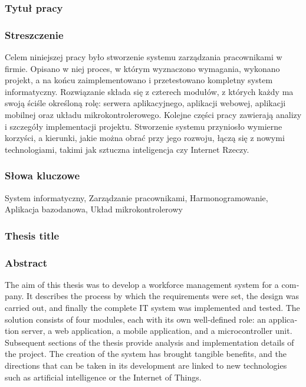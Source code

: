 \subsubsection*{Tytuł pracy}
\Title

\subsubsection*{Streszczenie}

Celem niniejszej pracy było stworzenie systemu zarządzania pracownikami w firmie. Opisano w niej proces, w którym wyznaczono wymagania, wykonano projekt, a na końcu zaimplementowano i przetestowano kompletny system informatyczny. Rozwiązanie składa się z czterech modułów, z których każdy ma swoją ściśle określoną rolę: serwera aplikacyjnego, aplikacji webowej, aplikacji mobilnej oraz układu mikrokontrolerowego. Kolejne części pracy zawierają analizy i szczegóły implementacji projektu. Stworzenie systemu przyniosło wymierne korzyści, a kierunki, jakie można obrać przy jego rozwoju, łączą się z nowymi technologiami, takimi jak sztuczna inteligencja czy Internet Rzeczy.

\subsubsection*{Słowa kluczowe}

System informatyczny, Zarządzanie pracownikami, Harmonogramowanie, Aplikacja bazodanowa, Układ mikrokontrolerowy

\subsubsection*{Thesis title}
\begin{otherlanguage}{british}
    \TitleAlt
\end{otherlanguage}

\subsubsection*{Abstract}
\begin{otherlanguage}{british}

    The aim of this thesis was to develop a workforce management system for a company. It describes the process by which the requirements were set, the design was carried out, and finally the complete IT system was implemented and tested. The solution consists of four modules, each with its own well-defined role: an application server, a web application, a mobile application, and a microcontroller unit. Subsequent sections of the thesis provide analysis and implementation details of the project. The creation of the system has brought tangible benefits, and the directions that can be taken in its development are linked to new technologies such as artificial intelligence or the Internet of Things.

\end{otherlanguage}
